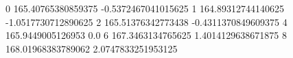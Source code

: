 0 165.40765380859375 -0.5372467041015625
1 164.89312744140625 -1.0517730712890625
2 165.51376342773438 -0.4311370849609375
4 165.9449005126953 0.0
6 167.3463134765625 1.4014129638671875
8 168.01968383789062 2.0747833251953125
